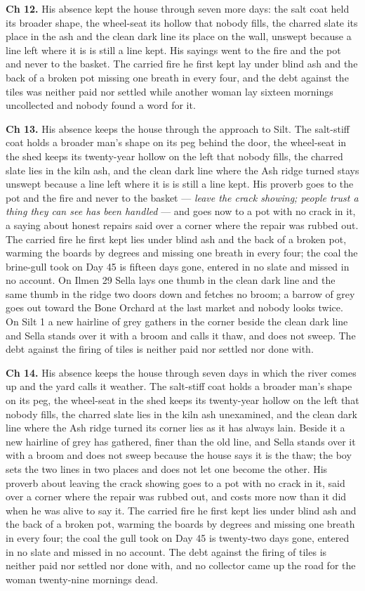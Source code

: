 \documentclass{design/chronicle}
\begin{document}
{\textbf{Ch 12.} His absence kept the house through seven more days: the salt coat held its broader shape, the wheel-seat its hollow that nobody fills, the charred slate its place in the ash and the clean dark line its place on the wall, unswept because a line left where it is is still a line kept. His sayings went to the fire and the pot and never to the basket. The carried fire he first kept lay under blind ash and the back of a broken pot missing one breath in every four, and the debt against the tiles was neither paid nor settled while another woman lay sixteen mornings uncollected and nobody found a word for it.

\textbf{Ch 13.} His absence keeps the house through the approach to Silt. The salt-stiff coat holds a broader man’s shape on its peg behind the door, the wheel-seat in the shed keeps its twenty-year hollow on the left that nobody fills, the charred slate lies in the kiln ash, and the clean dark line where the Ash ridge turned stays unswept because a line left where it is is still a line kept. His proverb goes to the pot and the fire and never to the basket --- \emph{leave the crack showing; people trust a thing they can see has been handled} --- and goes now to a pot with no crack in it, a saying about honest repairs said over a corner where the repair was rubbed out. The carried fire he first kept lies under blind ash and the back of a broken pot, warming the boards by degrees and missing one breath in every four; the coal the brine-gull took on Day 45 is fifteen days gone, entered in no slate and missed in no account. On Ilmen 29 Sella lays one thumb in the clean dark line and the same thumb in the ridge two doors down and fetches no broom; a barrow of grey goes out toward the Bone Orchard at the last market and nobody looks twice. On Silt 1 a new hairline of grey gathers in the corner beside the clean dark line and Sella stands over it with a broom and calls it thaw, and does not sweep. The debt against the firing of tiles is neither paid nor settled nor done with.

\textbf{Ch 14.} His absence keeps the house through seven days in which the river comes up and the yard calls it weather. The salt-stiff coat holds a broader man’s shape on its peg, the wheel-seat in the shed keeps its twenty-year hollow on the left that nobody fills, the charred slate lies in the kiln ash unexamined, and the clean dark line where the Ash ridge turned its corner lies as it has always lain. Beside it a new hairline of grey has gathered, finer than the old line, and Sella stands over it with a broom and does not sweep because the house says it is the thaw; the boy sets the two lines in two places and does not let one become the other. His proverb about leaving the crack showing goes to a pot with no crack in it, said over a corner where the repair was rubbed out, and costs more now than it did when he was alive to say it. The carried fire he first kept lies under blind ash and the back of a broken pot, warming the boards by degrees and missing one breath in every four; the coal the gull took on Day 45 is twenty-two days gone, entered in no slate and missed in no account. The debt against the firing of tiles is neither paid nor settled nor done with, and no collector came up the road for the woman twenty-nine mornings dead.

}
\end{document}

